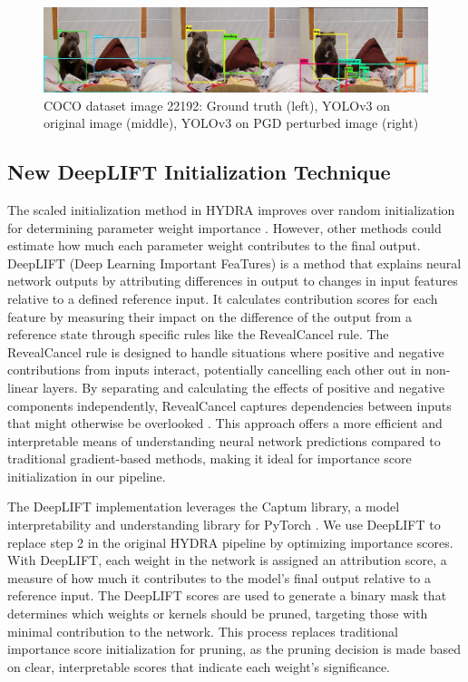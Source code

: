 \documentclass[10pt]{cai}
\begin{document}
\begin{figure}
    \centering
    \captionsetup{justification=centering}
    \includegraphics[width=1.0\linewidth]{figs/dog1.jpg}
    \caption{COCO dataset image 22192: Ground truth (left), YOLOv3 on original image (middle), YOLOv3 on PGD perturbed image (right) }
    \label{fig:dog1}
\end{figure}

\subsection{New DeepLIFT Initialization Technique}
The scaled initialization method in HYDRA improves over random initialization for determining parameter weight importance \cite{hydra}. However, other methods could estimate how much each parameter weight contributes to the final output. DeepLIFT (Deep Learning Important FeaTures) \cite{deeplift} is a method that explains neural network outputs by attributing differences in output to changes in input features relative to a defined reference input. It calculates contribution scores for each feature by measuring their impact on the difference of the output from a reference state through specific rules like the RevealCancel rule. The RevealCancel rule is designed to handle situations where positive and negative contributions from inputs interact, potentially cancelling each other out in non-linear layers. By separating and calculating the effects of positive and negative components independently, RevealCancel captures dependencies between inputs that might otherwise be overlooked \cite{deeplift}. This approach offers a more efficient and interpretable means of understanding neural network predictions compared to traditional gradient-based methods, making it ideal for importance score initialization in our pipeline.

The DeepLIFT implementation leverages the Captum library, a model interpretability and understanding library for PyTorch \cite{captum}. We use DeepLIFT to replace step 2 in the original HYDRA pipeline by optimizing importance scores. With DeepLIFT, each weight in the network is assigned an attribution score, a measure of how much it contributes to the model’s final output relative to a reference input. The DeepLIFT scores are used to generate a binary mask that determines which weights or kernels should be pruned, targeting those with minimal contribution to the network. This process replaces traditional importance score initialization for pruning, as the pruning decision is made based on clear, interpretable scores that indicate each weight’s significance.
\end{document}
